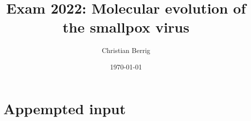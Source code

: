 \documentclass{article}
\author{Christian Berrig}
\date{\today}
\title{Exam 2022: Molecular evolution of the smallpox virus}
\begin{document}
% 
\maketitle
\section{Appempted input}

% 



\printbibliography

\appendix


% 
\end{document}
